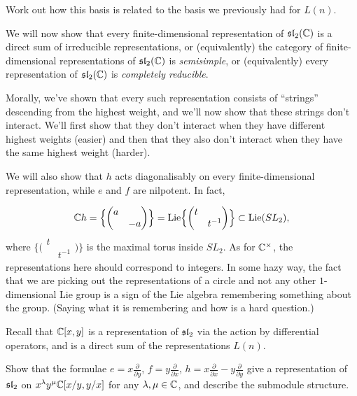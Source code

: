 \begin{exercise}
Work out how this basis is related to the basis we previously had for $L(n)$.
\end{exercise}

 We will now show that every finite-dimensional representation of
$\sl_2(\C)$ is a direct sum of irreducible representations, or
(equivalently) the category of finite-dimensional representations of
$\sl_2(\C)$ is \emph{semisimple}, or (equivalently) every representation of
$\sl_2(\C)$ is \emph{completely reducible}.

Morally, we've shown that every such representation consists of ``strings''
descending from the highest weight, and we'll now show that these strings
don't interact. We'll first show that they don't interact when they have
different highest weights (easier) and then that they also don't interact when
they have the same highest weight (harder).

We will also show that $h$ acts diagonalisably on every finite-dimensional
representation, while $e$ and $f$ are nilpotent. In fact,

\begin{remark}
\[
  \C h = \Bigl\{ \begin{pmatrix} a & \\ & -a \end{pmatrix} \Bigr\}
       = \Lie \Bigl\{ \begin{pmatrix} t & \\ & t^{-1} \end{pmatrix} \Bigr\}
       \subset \Lie(SL_2),
\]
where $\bigl\{\bigl(\begin{smallmatrix} t & \\ & t^{-1}\end{smallmatrix}\bigr)\bigr\}$
is the maximal torus inside $SL_2$. As for $\C^\times$, the representations
here should correspond to integers. In some hazy way, the fact that we are
picking out the representations of a circle and not any other $1$-dimensional
Lie group is a sign of the Lie algebra remembering something about the group.
(Saying what it is remembering and how is a hard question.)
\end{remark}

\begin{example}
Recall that $\C[x, y]$ is a representation of $\sl_2$ via the action by
differential operators, and is a direct sum of the representations $L(n)$.
\end{example}

\begin{exercise}
Show that the formulae $e = x\frac{\partial}{\partial y}$,
$f = y\frac{\partial}{\partial x}$,
$h = x\frac{\partial}{\partial x} - y\frac{\partial}{\partial y}$ give a
representation of $\sl_2$ on $x^\lambda y^\mu\C[x/y, y/x]$ for any
$\lambda, \mu \in \C$, and describe the submodule structure.
\end{exercise}

